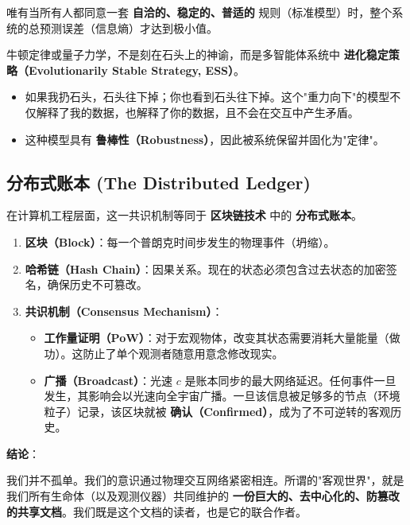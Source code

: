 唯有当所有人都同意一套 \textbf{自洽的、稳定的、普适的} 规则（标准模型）时，整个系统的总预测误差（信息熵）才达到极小值。

\begin{corollary}[物理定律即稳态策略]
牛顿定律或量子力学，不是刻在石头上的神谕，而是多智能体系统中 \textbf{进化稳定策略（Evolutionarily Stable Strategy, ESS）}。

\begin{itemize}
\item 如果我扔石头，石头往下掉；你也看到石头往下掉。这个"重力向下"的模型不仅解释了我的数据，也解释了你的数据，且不会在交互中产生矛盾。

\item 这种模型具有 \textbf{鲁棒性（Robustness）}，因此被系统保留并固化为"定律"。
\end{itemize}
\end{corollary}

\subsection{分布式账本 (The Distributed Ledger)}

在计算机工程层面，这一共识机制等同于 \textbf{区块链技术} 中的 \textbf{分布式账本}。

\begin{enumerate}
\item \textbf{区块（Block）}：每一个普朗克时间步发生的物理事件（坍缩）。

\item \textbf{哈希链（Hash Chain）}：因果关系。现在的状态必须包含过去状态的加密签名，确保历史不可篡改。

\item \textbf{共识机制（Consensus Mechanism）}：

    \begin{itemize}
    \item \textbf{工作量证明（PoW）}：对于宏观物体，改变其状态需要消耗大量能量（做功）。这防止了单个观测者随意用意念修改现实。

    \item \textbf{广播（Broadcast）}：光速 $c$ 是账本同步的最大网络延迟。任何事件一旦发生，其影响会以光速向全宇宙广播。一旦该信息被足够多的节点（环境粒子）记录，该区块就被 \textbf{确认（Confirmed）}，成为了不可逆转的客观历史。
    \end{itemize}
\end{enumerate}

\textbf{结论}：

我们并不孤单。我们的意识通过物理交互网络紧密相连。所谓的"客观世界"，就是我们所有生命体（以及观测仪器）共同维护的 \textbf{一份巨大的、去中心化的、防篡改的共享文档}。我们既是这个文档的读者，也是它的联合作者。
